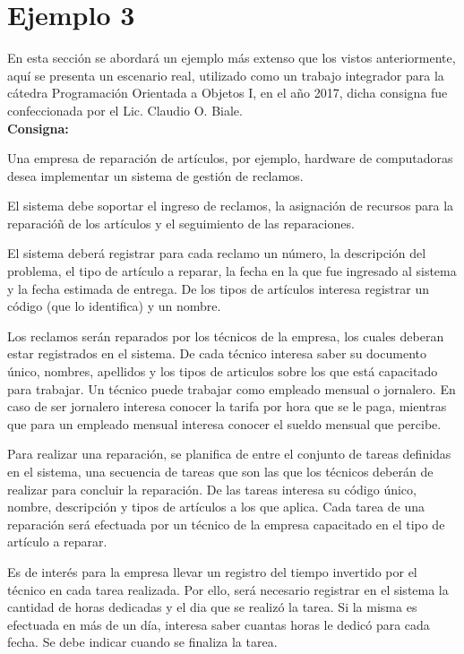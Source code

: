 

\section{Ejemplo 3}
\label{sec:ej3}
En esta sección se abordará un ejemplo más extenso que los vistos anteriormente,
aquí se presenta un escenario real, utilizado como un trabajo integrador para
la cátedra Programación Orientada a Objetos I, en el año 2017, dicha consigna
fue confeccionada por el Lic. Claudio O. Biale.\\

\textbf{Consigna:}
\begin{displayquote}
Una empresa de reparación de artículos, por ejemplo, hardware de computadoras
desea implementar un sistema de gestión de reclamos.

El sistema debe soportar el ingreso de reclamos, la asignación de recursos para
la reparacióñ de los artículos y el seguimiento de las reparaciones.

El sistema deberá registrar para cada reclamo un número, la descripción del
problema, el tipo de artículo a reparar, la fecha en la que fue ingresado al
sistema y la fecha estimada de entrega. De los tipos de artículos interesa
registrar un código (que lo identifica) y un nombre.

Los reclamos serán reparados por los técnicos de la empresa, los cuales deberan
estar registrados en el sistema. De cada técnico interesa saber su documento
único, nombres, apellidos y los tipos de articulos sobre los que está
capacitado para trabajar. Un técnico puede trabajar como empleado mensual o
jornalero. En caso de ser jornalero interesa conocer la tarifa por hora que se
le paga, mientras que para un empleado mensual interesa conocer el sueldo
mensual que percibe.

Para realizar una reparación, se planifica de entre el conjunto de tareas
definidas en el sistema, una secuencia de tareas que son las que los técnicos
deberán de realizar para concluir la reparación. De las tareas interesa su
código único, nombre, descripción y tipos de artículos a los que aplica. Cada
tarea de una reparación será efectuada por un técnico de la empresa capacitado
en el tipo de artículo a reparar.

Es de interés para la empresa llevar un registro del tiempo invertido por el
técnico en cada tarea realizada. Por ello, será necesario registrar en el
sistema la cantidad de horas dedicadas y el dia que se realizó la tarea. Si la
misma es efectuada en más de un día, interesa saber cuantas horas le dedicó
para cada fecha. Se debe indicar cuando se finaliza la tarea.
\end{displayquote}

